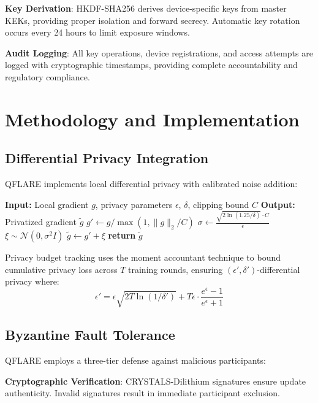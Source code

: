 \documentclass[conference]{IEEEtran}
\begin{document}
\textbf{Key Derivation}: HKDF-SHA256 derives device-specific keys from master KEKs, providing proper isolation and forward secrecy. Automatic key rotation occurs every 24 hours to limit exposure windows.

\textbf{Audit Logging}: All key operations, device registrations, and access attempts are logged with cryptographic timestamps, providing complete accountability and regulatory compliance.

\section{Methodology and Implementation}

\subsection{Differential Privacy Integration}

QFLARE implements local differential privacy with calibrated noise addition:

\begin{algorithm}[htbp]
\caption{Differential Privacy Protocol}
\begin{algorithmic}[1]
\STATE \textbf{Input:} Local gradient $g$, privacy parameters $\epsilon$, $\delta$, clipping bound $C$
\STATE \textbf{Output:} Privatized gradient $\tilde{g}$
\STATE $g' \leftarrow g / \max(1, \|g\|_2 / C)$ 
\STATE $\sigma \leftarrow \frac{\sqrt{2\ln(1.25/\delta)} \cdot C}{\epsilon}$ 
\STATE $\xi \sim \mathcal{N}(0, \sigma^2 I)$ 
\STATE $\tilde{g} \leftarrow g' + \xi$ 
\STATE \textbf{return} $\tilde{g}$
\end{algorithmic}
\end{algorithm}

Privacy budget tracking uses the moment accountant technique to bound cumulative privacy loss across $T$ training rounds, ensuring $(\epsilon', \delta')$-differential privacy where:
$$\epsilon' = \epsilon\sqrt{2T\ln(1/\delta')} + T\epsilon \cdot \frac{e^\epsilon - 1}{e^\epsilon + 1}$$

\subsection{Byzantine Fault Tolerance}

QFLARE employs a three-tier defense against malicious participants:

\textbf{Cryptographic Verification}: CRYSTALS-Dilithium signatures ensure update authenticity. Invalid signatures result in immediate participant exclusion.
\end{document}
